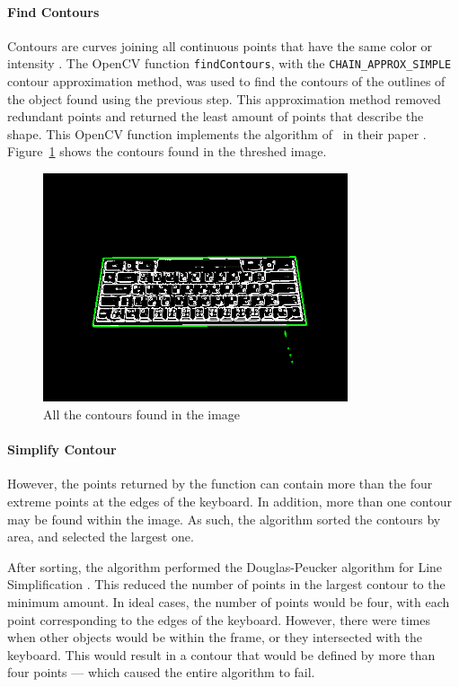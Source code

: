 \documentclass{report}
\begin{document}
\paragraph{Find Contours}
\label{section:metho-algo-key-contours}
Contours are curves joining all continuous points that have the same color or
intensity \parencite{opencv-contours}. The OpenCV function
\texttt{findContours}, with the \texttt{CHAIN\_APPROX\_SIMPLE} contour
approximation method, was used to find the contours of the outlines of the
object found using the previous step. This approximation method removed
redundant points and returned the least amount of points that describe the
shape. This OpenCV function implements the algorithm of~\textcite{contours} in their
paper . Figure~\ref{fig:metho-algo-contours} shows the contours
found in the threshed image.

\begin{figure}[H]
	\centering
	\includegraphics[width=0.8\textwidth]{find-contours.png}
	\caption{All the contours found in the image}
	\label{fig:metho-algo-contours}
	\centering
\end{figure}

\paragraph{Simplify Contour}
However, the points returned by the function can contain more than the four
extreme points at the edges of the keyboard. In addition, more than one contour
may be found within the image. As such, the algorithm sorted the contours by
area, and selected the largest one.

After sorting, the algorithm performed the Douglas-Peucker algorithm for Line
Simplification \parencite{douglas-peucker}. This reduced the number of points in
the largest contour to the minimum amount. In ideal cases, the number of points
would be four, with each point corresponding to the edges of the keyboard.
However, there were times when other objects would be within the frame, or they
intersected with the keyboard. This would result in a contour that would be
defined by more than four points --- which caused the entire algorithm to fail.
\end{document}
